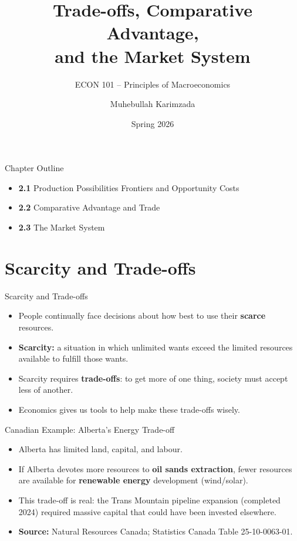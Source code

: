 \documentclass[aspectratio=169]{beamer}
\title{\textbf{Trade-offs, Comparative Advantage,\\ and the Market System}}
\subtitle{{\large ECON 101 -- Principles of Macroeconomics}}
\author{Muhebullah Karimzada}
\date{Spring 2026}
\begin{document}

\begin{frame}[plain]
  \titlepage
\end{frame}

\begin{frame}{Chapter Outline}
\transfade
\begin{itemize}[<+->]
  \item \textbf{2.1} Production Possibilities Frontiers and Opportunity Costs
  \item \textbf{2.2} Comparative Advantage and Trade
  \item \textbf{2.3} The Market System
\end{itemize}
\end{frame}

\section{Scarcity and Trade-offs}

\begin{frame}{Scarcity and Trade-offs}
\transfade
\begin{itemize}[<+->]
  \item People continually face decisions about how best to use their \textbf{scarce} resources.
  \item \textbf{Scarcity:} a situation in which unlimited wants exceed the limited resources available to fulfill those wants.
  \item Scarcity requires \textbf{trade-offs}: to get more of one thing, society must accept less of another.
  \item Economics gives us tools to help make these trade-offs wisely.
\end{itemize}
\end{frame}

\begin{frame}{Canadian Example: Alberta's Energy Trade-off}
\transfade
\begin{itemize}[<+->]
  \item Alberta has limited land, capital, and labour.
  \item If Alberta devotes more resources to \textbf{oil sands extraction}, fewer resources are available for \textbf{renewable energy} development (wind/solar).
  \item This trade-off is real: the Trans Mountain pipeline expansion (completed 2024) required massive capital that could have been invested elsewhere.
  \item \textbf{Source:} Natural Resources Canada; Statistics Canada Table 25-10-0063-01.
\end{itemize}
\end{frame}
\end{document}

